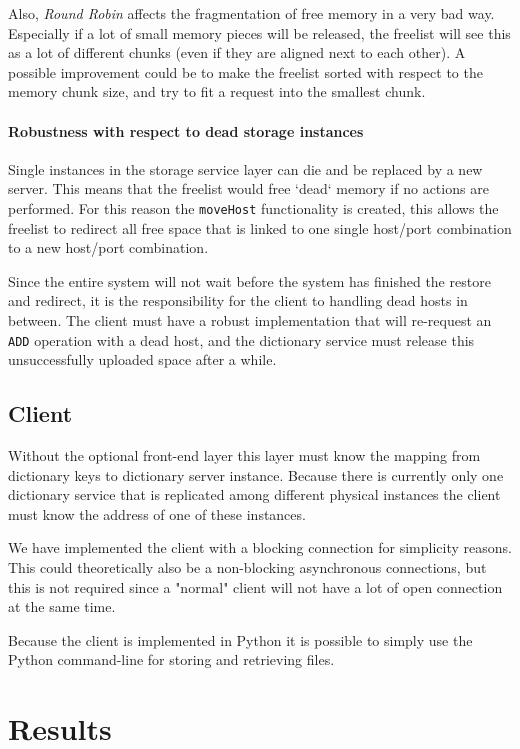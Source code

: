 \documentclass[12pt,a4paper]{scrartcl}
\begin{document}
Also, \emph{Round Robin} affects the fragmentation of free memory in a very bad way. Especially if a lot of small memory pieces will be released, the freelist will see this as a lot of different chunks (even if they are aligned next to each other). A possible improvement could be to make the freelist sorted with respect to the memory chunk size, and try to fit a request into the smallest chunk.

\paragraph{Robustness with respect to dead storage instances}
Single instances in the storage service layer can die and be replaced by a new server. This means that the freelist would free `dead` memory if no actions are performed. For this reason the \verb|moveHost| functionality is created, this allows the freelist to redirect all free space that is linked to one single host/port combination to a new host/port combination.

Since the entire system will not wait before the system has finished the restore and redirect, it is the responsibility for the client to handling dead hosts in between. The client must have a robust implementation that will re-request an \verb|ADD| operation with a dead host, and the dictionary service must release this unsuccessfully uploaded space after a while.

\subsection{Client}
Without the optional front-end layer this layer must know the mapping from dictionary keys to dictionary server instance. Because there is currently only one dictionary service that is replicated among different physical instances the client must know the address of one of these instances.

We have implemented the client with a blocking connection for simplicity reasons. This could theoretically also be a non-blocking asynchronous connections, but this is not required since a "normal" client will not have a lot of open connection at the same time.

Because the client is implemented in Python it is possible to simply use the Python command-line for storing and retrieving files.

\section{Results}
\end{document}
